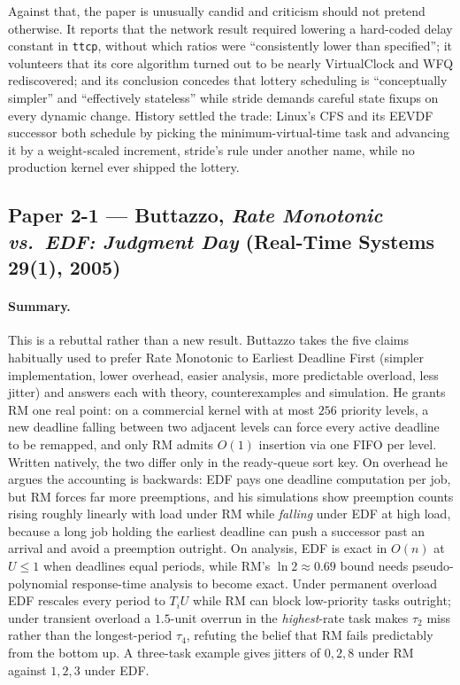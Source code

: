 Against that, the paper is unusually candid and criticism should not pretend otherwise. It
reports that the network result required lowering a hard-coded delay constant in \texttt{ttcp},
without which ratios were ``consistently lower than specified''; it volunteers that its core
algorithm turned out to be nearly VirtualClock and WFQ rediscovered; and its conclusion concedes
that lottery scheduling is ``conceptually simpler'' and ``effectively stateless'' while stride
demands careful state fixups on every dynamic change. History settled the trade: Linux's CFS and
its EEVDF successor both schedule by picking the minimum-virtual-time task and advancing it by a
weight-scaled increment, stride's rule under another name, while no production kernel ever
shipped the lottery.

\subsection*{Paper 2-1 --- Buttazzo, \emph{Rate Monotonic vs.\ EDF: Judgment Day} (Real-Time Systems 29(1), 2005)}

\paragraph{Summary.}
This is a rebuttal rather than a new result. Buttazzo takes the five claims habitually used to
prefer Rate Monotonic to Earliest Deadline First (simpler implementation, lower overhead, easier
analysis, more predictable overload, less jitter) and answers each with theory, counterexamples
and simulation. He grants RM one real point: on a commercial kernel with at most $256$ priority
levels, a new deadline falling between two adjacent levels can force every active deadline to be
remapped, and only RM admits $O(1)$ insertion via one FIFO per level. Written natively, the two
differ only in the ready-queue sort key. On overhead he argues
the accounting is backwards: EDF pays one deadline computation per job, but RM forces far more
preemptions, and his simulations show preemption counts rising roughly linearly with load under
RM while \emph{falling} under EDF at high load, because a long job holding the earliest deadline
can push a successor past an arrival and avoid a preemption outright. On analysis, EDF is exact
in $O(n)$ at $U \le 1$ when deadlines equal periods, while RM's $\ln 2 \approx 0.69$ bound needs
pseudo-polynomial response-time analysis to become exact.
Under permanent overload EDF rescales every period to $T_i U$ while RM can
block low-priority tasks outright; under transient overload a $1.5$-unit overrun in the
\emph{highest}-rate task makes $\tau_2$ miss rather than the longest-period $\tau_4$, refuting
the belief that RM fails predictably from the bottom up. A three-task example gives jitters of
$0, 2, 8$ under RM against $1, 2, 3$ under EDF.

